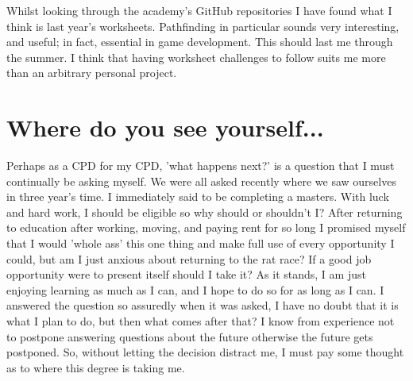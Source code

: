 \documentclass{scrartcl}
\begin{document}
Whilst looking through the academy's GitHub repositories I have found what I think is last year's worksheets. Pathfinding in particular sounds very interesting, and useful; in fact, essential in game development. This should last me through the summer. I think that having worksheet challenges to follow suits me more than an arbitrary personal project.

\section*{Where do you see yourself...}

Perhaps as a CPD for my CPD, 'what happens next?' is a question that I must continually be asking myself. We were all asked recently where we saw ourselves in three year's time. I immediately said to be completing a masters. With luck and hard work, I should be eligible so why should or shouldn't I? After returning to education after working, moving, and paying rent for so long I promised myself that I would 'whole ass' this one thing and make full use of every opportunity I could, but am I just anxious about returning to the rat race? If a good job opportunity were to present itself should I take it? As it stands, I am just enjoying learning as much as I can, and I hope to do so for as long as I can. I answered the question so assuredly when it was asked, I have no doubt that it is what I plan to do, but then what comes after that? I know from experience not to postpone answering questions about the future otherwise the future gets postponed. So, without letting the decision distract me, I must pay some thought as to where this degree is taking me.
\end{document}
